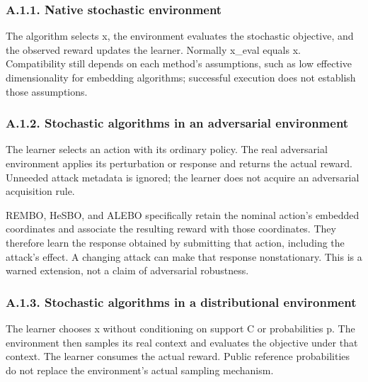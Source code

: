 \documentclass[10pt,a4paper]{article}
\begin{document}
\subsubsection*{A.1.1. Native stochastic environment}

The algorithm selects x,\allowbreak{} the environment evaluates the stochastic objective,\allowbreak{} and the observed reward updates the learner. Normally x\_\allowbreak{}eval equals x. Compatibility still depends on each method's assumptions,\allowbreak{} such as low effective dimensionality for embedding algorithms; successful execution does not establish those assumptions.


\subsubsection*{A.1.2. Stochastic algorithms in an adversarial environment}

The learner selects an action with its ordinary policy. The real adversarial environment applies its perturbation or response and returns the actual reward. Unneeded attack metadata is ignored; the learner does not acquire an adversarial acquisition rule.


REMBO,\allowbreak{} HeSBO,\allowbreak{} and ALEBO specifically retain the nominal action's embedded coordinates and associate the resulting reward with those coordinates. They therefore learn the response obtained by submitting that action,\allowbreak{} including the attack's effect. A changing attack can make that response nonstationary. This is a warned extension,\allowbreak{} not a claim of adversarial robustness.


\subsubsection*{A.1.3. Stochastic algorithms in a distributional environment}

The learner chooses x without conditioning on support C or probabilities p. The environment then samples its real context and evaluates the objective under that context. The learner consumes the actual reward. Public reference probabilities do not replace the environment's actual sampling mechanism.
\end{document}

